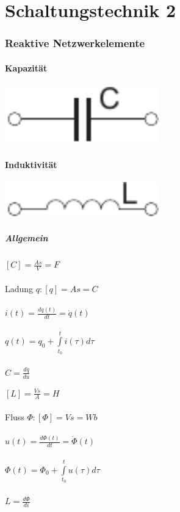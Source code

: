 \documentclass[a4paper,twocolumn,10pt]{article}
\begin{document}
\part*{Schaltungstechnik 2}

\section*{Reaktive Netzwerkelemente}

\begin{minipage}[t]{0.23\textwidth}
\subsection*{Kapazität}
\includegraphics[width=0.5\textwidth]{Grafiken/Kapazitaet}
\end{minipage}
\hfill
\begin{minipage}[t]{0.23\textwidth}
\subsection*{Induktivität}
\includegraphics[width=0.5\textwidth]{Grafiken/Induktivitaet}
\end{minipage}

\subsubsection*{Allgemein}
\begin{minipage}[b]{0.23\textwidth}
$[C]=\frac{As}{V}=F$\\\\
Ladung $q: [q]=As=C$\\\\
$i(t) = \frac{dq(t)}{dt}= \dot q(t)$\\\\
$q(t)=q_0+\int\limits_{t_0}^{t}i(\tau)d\tau$\\\\
$C=\frac{dq}{du}$
\end{minipage}
\hfill
\begin{minipage}[b]{0.23\textwidth}
$[L]=\frac{Vs}{A}=H$\\\\
Fluss $\Phi: [\Phi]=Vs=Wb$\\\\
$u(t) = \frac{d\Phi(t)}{dt}= \dot \Phi(t)$\\\\
$\Phi(t)=\Phi_0+\int\limits_{t_0}^{t}u(\tau)d\tau$\\\\
$L=\frac{d\Phi}{di}$
\end{minipage}
\end{document}
